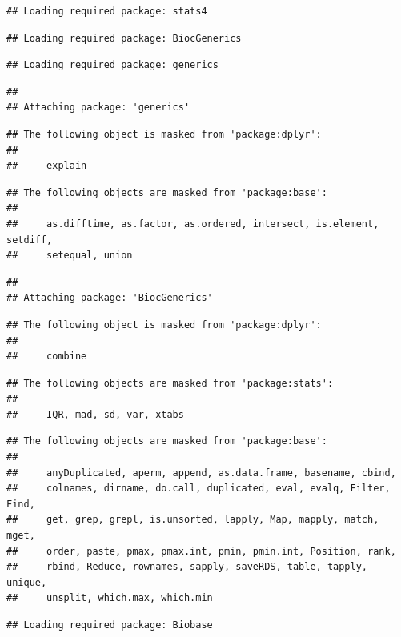 \documentclass[
]{article}
\begin{document}
\begin{verbatim}
## Loading required package: stats4
\end{verbatim}

\begin{verbatim}
## Loading required package: BiocGenerics
\end{verbatim}

\begin{verbatim}
## Loading required package: generics
\end{verbatim}

\begin{verbatim}
## 
## Attaching package: 'generics'
\end{verbatim}

\begin{verbatim}
## The following object is masked from 'package:dplyr':
## 
##     explain
\end{verbatim}

\begin{verbatim}
## The following objects are masked from 'package:base':
## 
##     as.difftime, as.factor, as.ordered, intersect, is.element, setdiff,
##     setequal, union
\end{verbatim}

\begin{verbatim}
## 
## Attaching package: 'BiocGenerics'
\end{verbatim}

\begin{verbatim}
## The following object is masked from 'package:dplyr':
## 
##     combine
\end{verbatim}

\begin{verbatim}
## The following objects are masked from 'package:stats':
## 
##     IQR, mad, sd, var, xtabs
\end{verbatim}

\begin{verbatim}
## The following objects are masked from 'package:base':
## 
##     anyDuplicated, aperm, append, as.data.frame, basename, cbind,
##     colnames, dirname, do.call, duplicated, eval, evalq, Filter, Find,
##     get, grep, grepl, is.unsorted, lapply, Map, mapply, match, mget,
##     order, paste, pmax, pmax.int, pmin, pmin.int, Position, rank,
##     rbind, Reduce, rownames, sapply, saveRDS, table, tapply, unique,
##     unsplit, which.max, which.min
\end{verbatim}

\begin{verbatim}
## Loading required package: Biobase
\end{verbatim}
\end{document}
